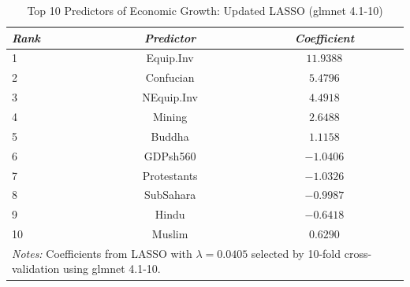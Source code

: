 \begin{table}[h]
\centering
\caption{Top 10 Predictors of Economic Growth: Updated LASSO (glmnet 4.1-10)}
\label{tab:top10}
\begin{tabular}{lcc}
\hline
\textit{Rank} & \textit{Predictor} & \textit{Coefficient} \\
\hline
1 & Equip.Inv & $11.9388$ \\
2 & Confucian & $5.4796$ \\
3 & NEquip.Inv & $4.4918$ \\
4 & Mining & $2.6488$ \\
5 & Buddha & $1.1158$ \\
6 & GDPsh560 & $-1.0406$ \\
7 & Protestants & $-1.0326$ \\
8 & SubSahara & $-0.9987$ \\
9 & Hindu & $-0.6418$ \\
10 & Muslim & $0.6290$ \\
\hline
\multicolumn{3}{p{0.75\textwidth}}{\small \textit{Notes:} Coefficients from LASSO with $\lambda = 0.0405$ selected by 10-fold cross-validation using glmnet 4.1-10.}
\end{tabular}
\end{table}
